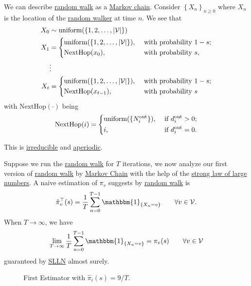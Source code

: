 We can describe \hyperref[algo:random-walk-algorithm]{random walk} as a \hyperref[def:Markov-chain]{Markov chain}. Consider \(\left\{ X_n \right\}_{n\geq 0}\) where \(X_n\) is the location of the \hyperref[def:random-walker]{random walker} at time \(n\). We see that
\[
	\begin{split}
		X_0 &\sim \mathrm{uniform}(\{1, 2, \dots , \left\vert \mathcal{V} \right\vert\})\\
		X_1 &=\begin{dcases}
			\mathrm{uniform}(\{1, 2, \dots , \left\vert \mathcal{V} \right\vert \}), & \text{ with probability }1 - s; \\
			\mathrm{NextHop}(x_0),                                                   & \text{ with probability }s,     \\
		\end{dcases}\\
		&\vdots\\
		X_t &=\begin{dcases}
			\mathrm{uniform}(\{1, 2, \dots , \left\vert \mathcal{V} \right\vert\}), & \text{ with probability }1 - s; \\
			\mathrm{NextHop}(x_{t-1}),                                              & \text{ with probability }s      \\
		\end{dcases}
	\end{split}
\]
with \(\mathrm{NextHop}(\cdot)\) being
\[
	\mathrm{NextHop}(i)=\begin{dcases}
		\mathrm{uniform}(\{N^{\text{out}}_i\}), & \text{ if }d^{\text{out}}_i > 0; \\
		i,                                      & \text{ if }d^{\text{out}}_i = 0.
	\end{dcases}
\]
\begin{note}
	This is \hyperref[def:irreducible]{irreducible} and \hyperref[def:aperiodic]{aperiodic}.
\end{note}

Suppose we run the \hyperref[algo:random-walk-algorithm]{random walk} for \(T\) iterations, we now analyze our first version of \hyperref[algo:random-walk-algorithm]{random walk} by \hyperref[def:Markov-chain]{Markov Chain} with the help of the \hyperref[thm:SLLN]{strong law of large numbers}. A naive estimation of \(\pi_v \) suggests by \hyperref[algo:random-walk-algorithm]{random walk} is
\[
	\hat{\pi}^{\top}_{v}(s)
	= \frac{1}{T}\sum\limits_{n=0}^{T-1} \mathbbm{1}_{\{X_n = v\}}\qquad \forall v\in \mathcal{V}.
\]
When \(T\to \infty \), we have
\[
	\lim_{T\to \infty}\frac{1}{T} \sum\limits_{n=0}^{T-1} \mathbbm{1}_{\{X_n = v\}} = \pi_v(s) \qquad \forall v\in \mathcal{V}
\]
guaranteed by \hyperref[thm:SLLN]{SLLN} almost surely.
\begin{figure}[H]
	\centering
	\caption{First Estimator with \(\hat{\pi}_i(s) = 9/T\).}
	\label{fig:Monte-Carlo-Estimator-1}
\end{figure}


